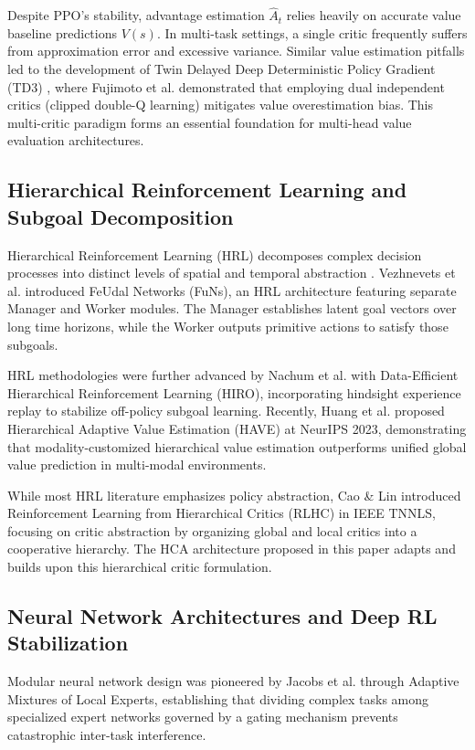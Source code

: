 \documentclass[conference]{IEEEtran}
\begin{document}
Despite PPO's stability, advantage estimation \(\hat{A}_t\) relies heavily on accurate value baseline predictions \(V(s)\). In multi-task settings, a single critic frequently suffers from approximation error and excessive variance. Similar value estimation pitfalls led to the development of Twin Delayed Deep Deterministic Policy Gradient (TD3) \cite{fujimoto2018addressing}, where Fujimoto et al. demonstrated that employing dual independent critics (clipped double-Q learning) mitigates value overestimation bias. This multi-critic paradigm forms an essential foundation for multi-head value evaluation architectures.

\subsection{Hierarchical Reinforcement Learning and Subgoal Decomposition}
Hierarchical Reinforcement Learning (HRL) decomposes complex decision processes into distinct levels of spatial and temporal abstraction \cite{sutton2018reinforcement}. Vezhnevets et al. \cite{vezhnevets2017feudal} introduced FeUdal Networks (FuNs), an HRL architecture featuring separate Manager and Worker modules. The Manager establishes latent goal vectors over long time horizons, while the Worker outputs primitive actions to satisfy those subgoals.

HRL methodologies were further advanced by Nachum et al. \cite{nachum2018data} with Data-Efficient Hierarchical Reinforcement Learning (HIRO), incorporating hindsight experience replay to stabilize off-policy subgoal learning. Recently, Huang et al. \cite{huang2023hierarchical} proposed Hierarchical Adaptive Value Estimation (HAVE) at NeurIPS 2023, demonstrating that modality-customized hierarchical value estimation outperforms unified global value prediction in multi-modal environments.

While most HRL literature emphasizes policy abstraction, Cao \& Lin \cite{cao2023reinforcement} introduced Reinforcement Learning from Hierarchical Critics (RLHC) in IEEE TNNLS, focusing on critic abstraction by organizing global and local critics into a cooperative hierarchy. The HCA architecture proposed in this paper adapts and builds upon this hierarchical critic formulation.

\subsection{Neural Network Architectures and Deep RL Stabilization}
Modular neural network design was pioneered by Jacobs et al. \cite{jacobs1991adaptive} through Adaptive Mixtures of Local Experts, establishing that dividing complex tasks among specialized expert networks governed by a gating mechanism prevents catastrophic inter-task interference.
\end{document}
